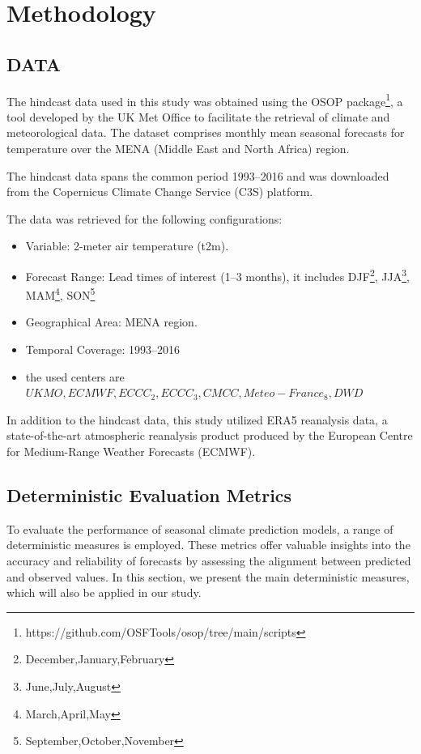 \chapter{Methodology}

\section{DATA}

The hindcast data used in this study was obtained using the OSOP package\footnote{https://github.com/OSFTools/osop/tree/main/scripts}, a tool developed by the UK Met Office to facilitate the retrieval of climate and meteorological data. The dataset comprises monthly mean seasonal forecasts for temperature over the MENA (Middle East and North Africa) region.


The hindcast data spans the common period 1993–2016 and was downloaded from the Copernicus Climate Change Service (C3S) platform. 


The data was retrieved for the following configurations:
\begin{itemize}
	\item Variable: 2-meter air temperature (t2m).
	\item Forecast Range: Lead times of interest (1–3 months), it includes DJF\footnote{December,January,February}, JJA\footnote{June,July,August}, MAM\footnote{March,April,May}, SON\footnote{September,October,November}
	\item Geographical Area: MENA region.
	\item Temporal Coverage: 1993–2016
	\item the used centers are $UKMO,ECMWF,ECCC_2,ECCC_3,CMCC,Meteo-France_8,DWD$
\end{itemize}


In addition to the hindcast data, this study utilized ERA5 reanalysis data, a state-of-the-art atmospheric reanalysis product produced by the European Centre for Medium-Range Weather Forecasts (ECMWF). 

    

\section{Deterministic Evaluation Metrics}
To evaluate the performance of seasonal climate prediction models, a range of deterministic measures is employed. These metrics offer valuable insights into the accuracy and reliability of forecasts by assessing the alignment between predicted and observed values. In this section, we present the main deterministic measures, which will also be applied in our study.
